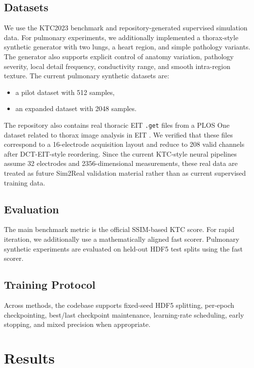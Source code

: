 \documentclass[11pt,a4paper]{article}
\begin{document}
\subsection{Datasets}
We use the KTC2023 benchmark and repository-generated supervised simulation data. For pulmonary experiments, we additionally implemented a thorax-style synthetic generator with two lungs, a heart region, and simple pathology variants. The generator also supports explicit control of anatomy variation, pathology severity, local detail frequency, conductivity range, and smooth intra-region texture. The current pulmonary synthetic datasets are:
\begin{itemize}[leftmargin=1.5em]
    \item a pilot dataset with 512 samples,
    \item an expanded dataset with 2048 samples.
\end{itemize}

The repository also contains real thoracic EIT \texttt{.get} files from a PLOS One dataset related to thorax image analysis in EIT \cite{li2021thorax}. We verified that these files correspond to a 16-electrode acquisition layout and reduce to 208 valid channels after DCT-EIT-style reordering. Since the current KTC-style neural pipelines assume 32 electrodes and 2356-dimensional measurements, these real data are treated as future Sim2Real validation material rather than as current supervised training data.

\subsection{Evaluation}
The main benchmark metric is the official SSIM-based KTC score. For rapid iteration, we additionally use a mathematically aligned fast scorer. Pulmonary synthetic experiments are evaluated on held-out HDF5 test splits using the fast scorer.

\subsection{Training Protocol}
Across methods, the codebase supports fixed-seed HDF5 splitting, per-epoch checkpointing, best/last checkpoint maintenance, learning-rate scheduling, early stopping, and mixed precision when appropriate.

\section{Results}
\end{document}
